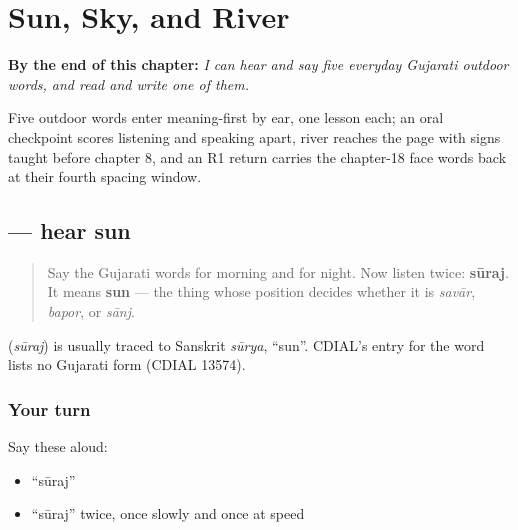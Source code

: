 
\chapter{Sun, Sky, and River}
\label{ch:gu-sun-sky-river}

\begin{chapteropening}
\textbf{By the end of this chapter:} \emph{I can hear and say five everyday Gujarati outdoor words, and read and write one of them.}

Five outdoor words enter meaning-first by ear, one lesson each; an oral checkpoint scores listening and speaking apart, river reaches the page with signs taught before chapter 8, and an R1 return carries the chapter-18 face words back at their fourth spacing window.
\end{chapteropening}

\section[\texorpdfstring{\gu{સૂરજ} (sūraj)}{સૂરજ (sūraj)}]{ — hear sun}

\label{lesson:GU-C29-hear-sooraj}



\begin{quote}
Say the Gujarati words for morning and for night. Now listen twice: \textbf{sūraj}. It means \textbf{sun} — the thing whose position decides whether it is \emph{savār}, \emph{bapor}, or \emph{sānj}.
\end{quote}

\begin{cousinweb}
\textbf{} (\emph{sūraj}) is usually traced to Sanskrit \emph{sūrya}, \textquotedblleft{}sun\textquotedblright{}. CDIAL's entry for the word lists no Gujarati form (CDIAL 13574).
\end{cousinweb}

\subsection*{Your turn}
Say these aloud:

\begin{itemize}
\raggedright
  \item \textquotedblleft{}sūraj\textquotedblright{}
  \item \textquotedblleft{}sūraj\textquotedblright{} twice, once slowly and once at speed
\end{itemize}

